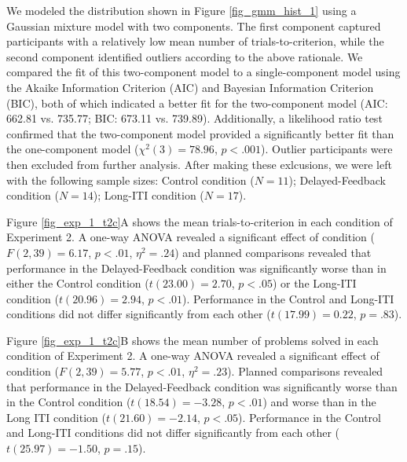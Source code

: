 \documentclass[doc, floatsintext]{apa7}
\begin{document}
% 
%

We modeled the distribution shown in Figure
\ref{fig_gmm_hist_1} using a Gaussian mixture model with two
components. The first component captured participants with a
relatively low mean number of trials-to-criterion, while the
second component identified outliers according to the above
rationale. We compared the fit of this two-component model
to a single-component model using the Akaike Information
Criterion (AIC) and Bayesian Information Criterion (BIC),
both of which indicated a better fit for the two-component
model (AIC: 662.81 vs. 735.77; BIC: 673.11 vs. 739.89).
Additionally, a likelihood ratio test confirmed that the
two-component model provided a significantly better fit than
the one-component model ($\chi^2(3) = 78.96$, $p < .001$).
Outlier participants were then excluded from further
analysis.  After making these exlcusions, we were left with
the following sample sizes: Control condition ($ N = 11$);
Delayed-Feedback condition ($N = 14$);  Long-ITI condition
($N = 17$).

Figure \ref{fig_exp_1_t2c}A shows the mean
trials-to-criterion in each condition of Experiment 2.  A
one-way ANOVA revealed a significant effect of condition
($F(2, 39) = 6.17$, $p < .01$, $\eta^2 = .24$) and planned
comparisons revealed that performance in the
Delayed-Feedback condition was significantly worse than in
either the Control condition ($t(23.00) = 2.70$, $p < .05$)
or the Long-ITI condition ($t(20.96) = 2.94$, $p < .01$).
Performance in the Control and Long-ITI conditions did not
differ significantly from each other ($t(17.99) = 0.22$, $p
= .83$).

%

Figure \ref{fig_exp_1_t2c}B shows the mean number of
problems solved in each condition of Experiment 2. A one-way
ANOVA revealed a significant effect of condition ($F(2, 39)
= 5.77$, $p < .01$, $\eta^2 = .23$). Planned comparisons
revealed that performance in the Delayed-Feedback condition
was significantly worse than in the Control condition
($t(18.54) = -3.28$, $p < .01$) and worse than in the Long
ITI condition ($t(21.60) = -2.14$, $p < .05$).  Performance
in the Control and Long-ITI conditions did not differ
significantly from each other ($t(25.97) = -1.50$, $p=.15$).
\end{document}
